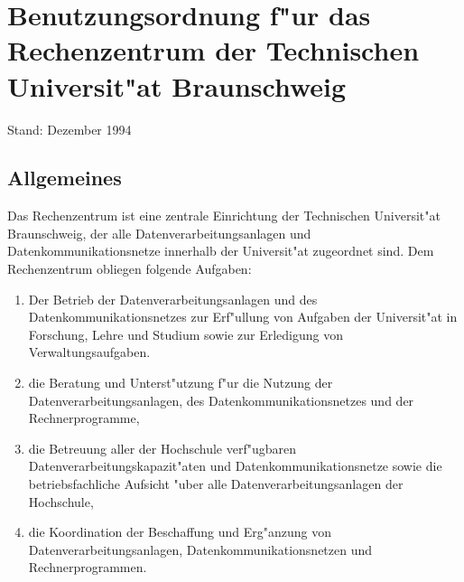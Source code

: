 
\section[RZ-Benutzungsordnung der TU Braunschweig]{Benutzungsordnung f"ur das
  Rechenzentrum der Technischen Universit"at Braunschweig}
\label{RZordnung}

{\small Stand: Dezember 1994}

\subsection{Allgemeines}


Das Rechenzentrum ist eine zentrale Einrichtung der Technischen
Universit"at Braunschweig, der alle Datenverarbeitungsanlagen und
Datenkommunikationsnetze innerhalb der Universit"at zugeordnet sind.
Dem Rechenzentrum obliegen folgende Aufgaben:

\begin{enumerate}
 \item Der Betrieb der Datenverarbeitungsanlagen und des
       Datenkommunikationsnetzes zur Erf"ullung von Aufgaben der
       Universit"at in Forschung, Lehre und Studium sowie zur
       Erledigung von Verwaltungsaufgaben.
 \item die Beratung und Unterst"utzung f"ur die Nutzung der
       Datenverarbeitungsanlagen, des Datenkommunikationsnetzes und der
       Rechnerprogramme,
 \item die Betreuung aller der Hochschule verf"ugbaren
       Datenverarbeitungskapazit"aten und Datenkommunikationsnetze
       sowie die betriebsfachliche Aufsicht "uber alle
       Datenverarbeitungsanlagen der Hochschule,
 \item die Koordination der Beschaffung und Erg"anzung von
       Datenverarbeitungsanlagen, Datenkommunikationsnetzen und
       Rechnerprogrammen.
\end{enumerate}


